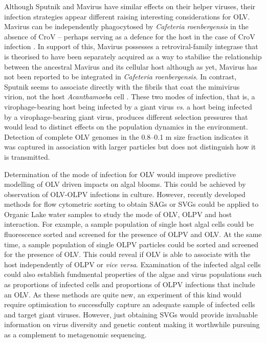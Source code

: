 Although Sputnik and Mavirus have similar effects on their helper viruses, their infection strategies appear different raising interesting considerations for \ac{OLV}.
Mavirus can be independently phagocytosed by \emph{Cafeteria roenbergensis} in the absence of \ac{CroV} -- perhaps serving as a defence for the host in the case of \ac{CroV} infection \cite{Fischer2011a}.
In support of this, Mavirus possesses a retroviral-family integrase that is theorised to have been separately acquired as a way to stabilise the relationship between the ancestral Mavirus and its cellular host \cite{Fischer2011a} although as yet, Mavirus has not been reported to be integrated in \emph{Cafeteria roenbergensis}.
In contrast, Sputnik seems to associate directly with the fibrils that coat the mimivirus virion, not the host \emph{Acanthamoeba} cell \cite{Boyer2011}.
These two modes of infection, that is, a virophage-bearing host being infected by a giant virus \emph{vs}. a host being infected by a virophage-bearing giant virus, produces different selection pressures that would lead to distinct effects on the population dynamics in the environment.
Detection of complete \ac{OLV} genomes in the 0.8--0.1 \textmu{}m size fraction indicates it was captured in association with larger particles but does not distinguish how it is transmitted.

Determination of the mode of infection for \ac{OLV} would improve predictive modelling of \ac{OLV} driven impacts on algal blooms.
This could be achieved by observation of \ac{OLV}-\ac{OLPV} infections in culture.
However, recently developed methods for flow cytometric sorting to obtain \acp{SAG} or \acp{SVG} \cite{Martinez-Martinez2011, Allen2011} could be applied to Organic Lake water samples to study the mode of \ac{OLV}, \ac{OLPV} and host interaction.
For example, a sample population of single host algal cells could be fluorescence sorted and screened for the presence of \ac{OLPV} and \ac{OLV}.
At the same time, a sample population of single \ac{OLPV} particles could be sorted and screened for the presence of \ac{OLV}.
This could reveal if \ac{OLV} is able to associate with the host independently of \ac{OLPV} or \emph{vice versa}.
Examination of the infected algal cells could also establish fundmental properties of the algae and virus populations such as proportions of infected cells and proportions of \ac{OLPV} infections that include an \ac{OLV}.
As these methods are quite new, an experiment of this kind would require optimisation to successfully capture an adequate sample of infected cells and target giant viruses.
However, just obtaining \acp{SVG} would provide invaluable information on virus diversity and genetic content making it worthwhile pursuing as a complement to metagenomic sequencing.

